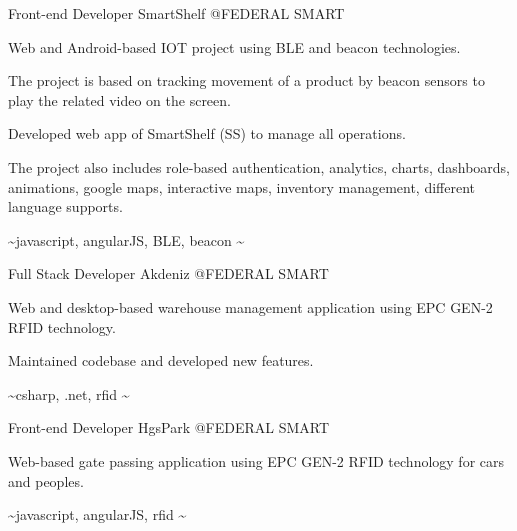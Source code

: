 \begin{cventries}
  \cventry
    {Front-end Developer} %
    {SmartShelf} %
    {@FEDERAL SMART} %
    {}
    {
      \begin{cvitems} %
        \item {Web and Android-based IOT project using BLE and beacon technologies.}
        \item {The project is based on tracking movement of a product by beacon sensors to play the related video on the screen.}
        \item {Developed web app of SmartShelf (SS) to manage all operations.}
        \item {The project also includes role-based authentication, analytics, charts, dashboards, animations, google maps, interactive maps, inventory management, different language supports.}
        \item {\textasciitilde javascript, angularJS, BLE, beacon \textasciitilde}
      \end{cvitems}
    }

  \cventry
    {Full Stack Developer} %
    {Akdeniz} %
    {@FEDERAL SMART} %
    {}
    {
      \begin{cvitems} %
        \item {Web and desktop-based warehouse management application using EPC GEN-2 RFID technology.}
        \item {Maintained codebase and developed new features.}
        \item {\textasciitilde csharp, .net, rfid \textasciitilde}
      \end{cvitems}
    }

  \cventry
    {Front-end Developer} %
    {HgsPark} %
    {@FEDERAL SMART} %
    {}
    {
      \begin{cvitems} %
        \item {Web-based gate passing application using EPC GEN-2 RFID technology for cars and peoples.}
        \item {\textasciitilde javascript, angularJS, rfid \textasciitilde}
      \end{cvitems}
    }

\end{cventries}

